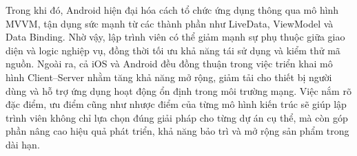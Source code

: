     
        \hspace*{0.8cm}Trong khi đó, Android hiện đại hóa cách tổ chức ứng dụng thông qua mô hình MVVM, tận dụng sức mạnh từ các thành phần như LiveData, ViewModel và Data Binding. Nhờ vậy, lập trình viên có thể giảm mạnh sự phụ thuộc giữa giao diện và logic nghiệp vụ, đồng thời tối ưu khả năng tái sử dụng và kiểm thử mã nguồn. Ngoài ra, cả iOS và Android đều đồng thuận trong việc triển khai mô hình Client–Server nhằm tăng khả năng mở rộng, giảm tải cho thiết bị người dùng và hỗ trợ ứng dụng hoạt động ổn định trong môi trường mạng. Việc nắm rõ đặc điểm, ưu điểm cũng như nhược điểm của từng mô hình kiến trúc sẽ giúp lập trình viên không chỉ lựa chọn đúng giải pháp cho từng dự án cụ thể, mà còn góp phần nâng cao hiệu quả phát triển, khả năng bảo trì và mở rộng sản phẩm trong dài hạn.
    
